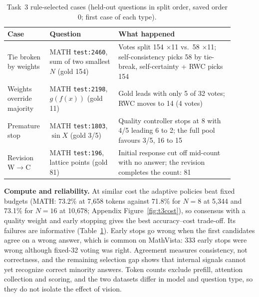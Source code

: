 \documentclass{article}
\begin{document}
\begin{table}[t]
\centering
\caption{Task~3 rule-selected cases (held-out questions in split order, saved order 0; first case of each type).}
\label{tab:t3ex}
\scriptsize
\begin{tabular}{>{\raggedright\arraybackslash}p{0.15\linewidth}>{\raggedright\arraybackslash}p{0.28\linewidth}>{\raggedright\arraybackslash}p{0.47\linewidth}}
\toprule
Case & Question & What happened\\
\midrule
Tie broken by weights & MATH \texttt{test:2460}, sum of two smallest $N$ (gold 154) & Votes split 154 $\times$11 vs.\ 58 $\times$11; self-consistency picks 58 by tie-break, self-certainty + RWC picks 154\\
Weights override majority & MATH \texttt{test:2198}, $g(f(x))$ (gold 11) & Gold leads with only 5 of 32 votes; RWC moves to 14 (4 votes)\\
Premature stop & MATH \texttt{test:1803}, $\sin X$ (gold 3/5) & Quality controller stops at 8 with 4/5 leading 6 to 2; the full pool favours 3/5, 16 to 15\\
Revision W$\to$C & MATH \texttt{test:196}, lattice points (gold 81) & Initial response cut off mid-count with no answer; the revision completes the count: 81\\
\bottomrule
\end{tabular}
\end{table}

\textbf{Compute and reliability.} At similar cost the adaptive policies beat fixed budgets (MATH: 73.2\% at 7,658 tokens against 71.8\% for $N{=}8$ at 5,344 and 73.1\% for $N{=}16$ at 10,678; Appendix Figure~\ref{fig:t3cost}), so consensus with a quality weight and early stopping gives the best accuracy--cost trade-off. Its failures are informative (Table~\ref{tab:t3ex}). Early stops go wrong when the first candidates agree on a wrong answer, which is common on MathVista: 333 early stops were wrong although fixed-32 voting was right. Agreement measures consistency, not correctness, and the remaining selection gap shows that internal signals cannot yet recognize correct minority answers. Token counts exclude prefill, attention collection and scoring, and the two datasets differ in model and question type, so they do not isolate the effect of vision.

\FloatBarrier
\end{document}
